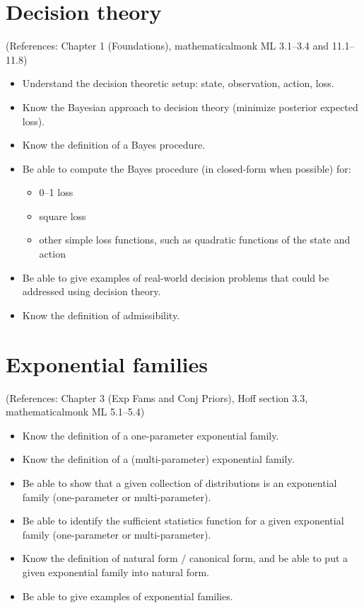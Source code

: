 \documentclass[12pt]{article}
\begin{document}
\section{Decision theory}
(References: Chapter 1 (Foundations), mathematicalmonk ML 3.1--3.4 and 11.1--11.8)
\begin{itemize}
\setlength\itemsep{0em}
\item Understand the decision theoretic setup: state, observation, action, loss.
\item Know the Bayesian approach to decision theory (minimize posterior expected loss).
\item Know the definition of a Bayes procedure.
\item Be able to compute the Bayes procedure (in closed-form when possible) for:
\begin{itemize}
\item 0--1 loss
\item square loss
\item other simple loss functions, such as quadratic functions of the state and action
\end{itemize}
\item Be able to give examples of real-world decision problems that could be addressed using decision theory.
\item Know the definition of admissibility.
\end{itemize}


\section{Exponential families}
(References: Chapter 3 (Exp Fams and Conj Priors), Hoff section 3.3, mathematicalmonk ML 5.1--5.4)
\begin{itemize}
\setlength\itemsep{0em}
\item Know the definition of a one-parameter exponential family.
\item Know the definition of a (multi-parameter) exponential family.
\item Be able to show that a given collection of distributions is an exponential family (one-parameter or multi-parameter).
\item Be able to identify the sufficient statistics function for a given exponential family (one-parameter or multi-parameter).
\item Know the definition of natural form / canonical form, and be able to put a given exponential family into natural form. 
\item Be able to give examples of exponential families.
\end{itemize}
\end{document}

